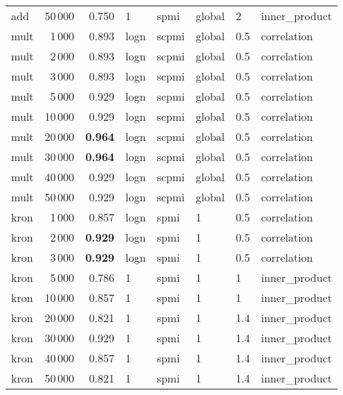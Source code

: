 \begin{tabular}{lrrlllll}
     add &           50\,000 &      0.750 &     1 &   spmi &  global &    2 &  inner\_product \\ \addlinespace
    mult &            1\,000 &      0.893 &  logn &  scpmi &  global &  0.5 &    correlation \\
    mult &            2\,000 &      0.893 &  logn &  scpmi &  global &  0.5 &    correlation \\
    mult &            3\,000 &      0.893 &  logn &  scpmi &  global &  0.5 &    correlation \\
    mult &            5\,000 &      0.929 &  logn &  scpmi &  global &  0.5 &    correlation \\
    mult &           10\,000 &      0.929 &  logn &  scpmi &  global &  0.5 &    correlation \\
    mult &           20\,000 &      \textbf{0.964} &  logn &  scpmi &  global &  0.5 &    correlation \\
    mult &           30\,000 &      \textbf{0.964} &  logn &  scpmi &  global &  0.5 &    correlation \\
    mult &           40\,000 &      0.929 &  logn &  scpmi &  global &  0.5 &    correlation \\
    mult &           50\,000 &      0.929 &  logn &  scpmi &  global &  0.5 &    correlation \\ \addlinespace
    kron &            1\,000 &      0.857 &  logn &   spmi &       1 &  0.5 &    correlation \\
    kron &            2\,000 &      \textbf{0.929} &  logn &   spmi &       1 &  0.5 &    correlation \\
    kron &            3\,000 &      \textbf{0.929} &  logn &   spmi &       1 &  0.5 &    correlation \\
    kron &            5\,000 &      0.786 &     1 &   spmi &       1 &    1 &  inner\_product \\
    kron &           10\,000 &      0.857 &     1 &   spmi &       1 &    1 &  inner\_product \\
    kron &           20\,000 &      0.821 &     1 &   spmi &       1 &  1.4 &  inner\_product \\
    kron &           30\,000 &      0.929 &     1 &   spmi &       1 &  1.4 &  inner\_product \\
    kron &           40\,000 &      0.857 &     1 &   spmi &       1 &  1.4 &  inner\_product \\
    kron &           50\,000 &      0.821 &     1 &   spmi &       1 &  1.4 &  inner\_product \\
\bottomrule
\end{tabular}
